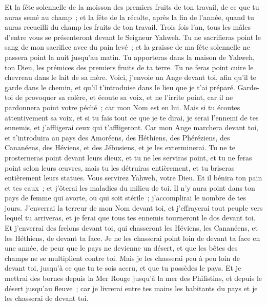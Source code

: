 \begin{multicols}{2}
Et la fête solennelle de la moisson des premiers fruits de ton travail, de ce que tu auras semé au champ~; et la fête de la récolte, après la fin de l'année, quand tu auras recueilli du champ les fruits de ton travail.
Trois fois l'an, tous les mâles d'entre vous se présenteront devant le Seigneur Yahweh.
Tu ne sacrifieras point le sang de mon sacrifice avec du pain levé~; et la graisse de ma fête solennelle ne passera point la nuit jusqu'au matin.
Tu apporteras dans la maison de Yahweh, ton Dieu, les prémices des premiers fruits de ta terre. Tu ne feras point cuire le chevreau dans le lait de sa mère.
Voici, j'envoie un Ange devant toi, afin qu'il te garde dans le chemin, et qu'il t'introduise dans le lieu que je t'ai préparé.
Garde-toi de provoquer sa colère, et écoute sa voix, et ne l'irrite point, car il ne pardonnera point votre péché~; car mon Nom est en lui.
Mais si tu écoutes attentivement sa voix, et si tu fais tout ce que je te dirai, je serai l'ennemi de tes ennemis, et j'affligerai ceux qui t'affligeront.
Car mon Ange marchera devant toi, et t'introduira au pays des Amoréens, des Héthiens, des Phéréziens, des Cananéens, des Héviens, et des Jébusiens, et je les exterminerai.
Tu ne te prosterneras point devant leurs dieux, et tu ne les serviras point, et tu ne feras point selon leurs œuvres, mais tu les détruiras entièrement, et tu briseras entièrement leurs statues.
Vous servirez Yahweh, votre Dieu. Et il bénira ton pain et tes eaux~; et j'ôterai les maladies du milieu de toi.
Il n'y aura point dans ton pays de femme qui avorte, ou qui soit stérile~; j'accomplirai le nombre de tes jours.
J'enverrai la terreur de mon Nom devant toi, et j'effrayerai tout peuple vers lequel tu arriveras, et je ferai que tous tes ennemis tourneront le dos devant toi.
Et j'enverrai des frelons devant toi, qui chasseront les Héviens, les Cananéens, et les Héthiens, de devant ta face.
Je ne les chasserai point loin de devant ta face en une année, de peur que le pays ne devienne un désert, et que les bêtes des champs ne se multiplient contre toi.
Mais je les chasserai peu à peu loin de devant toi, jusqu'à ce que tu te sois accru, et que tu possèdes le pays.
Et je mettrai des bornes depuis la Mer Rouge jusqu'à la mer des Philistins, et depuis le désert jusqu'au fleuve~; car je livrerai entre tes mains les habitants du pays et je les chasserai de devant toi.

\end{multicols}

